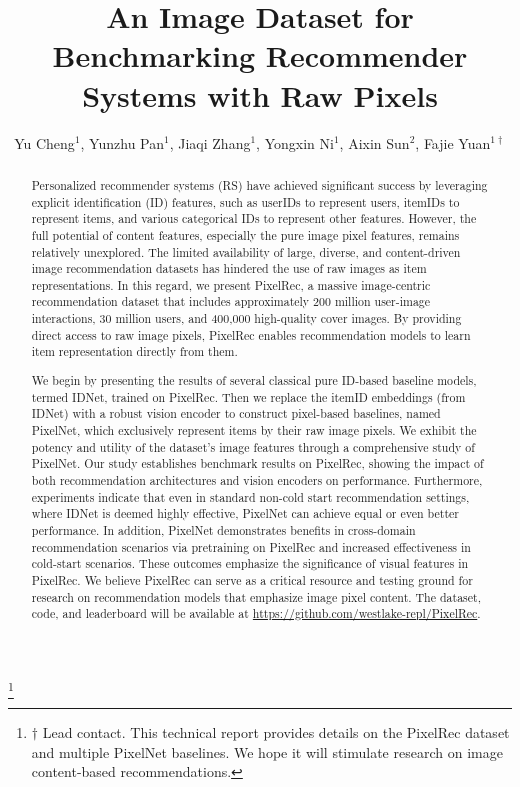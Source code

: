 \documentclass[sigconf]{acmart}
\begin{document}
\title{An Image Dataset for Benchmarking Recommender Systems with Raw Pixels}
\author{Yu Cheng$^{1}$, Yunzhu Pan$^{1}$, Jiaqi Zhang$^{1}$, Yongxin Ni$^{1}$, Aixin Sun$^{2}$, Fajie Yuan$^{1\dagger}$}


\thanks{$\dagger$ Lead contact. This technical report provides details on the PixelRec dataset and multiple PixelNet baselines. We hope it will stimulate research on image content-based recommendations.} 

 


\renewcommand{\shortauthors}{Cheng et al.}

\begin{abstract}
Personalized recommender systems (RS) have achieved significant success by leveraging explicit identification (ID) features, such as userIDs to represent users, itemIDs to represent items, and various categorical IDs to represent other features. However, the full potential of content features, especially the pure image pixel features, remains relatively unexplored. The limited availability of large, diverse, and content-driven image recommendation datasets has hindered the use of raw images as item representations. In this regard, we present PixelRec, a massive image-centric recommendation dataset that includes approximately 200 million user-image interactions, 30 million users, and 400,000 high-quality cover images. By providing direct access to raw image pixels, PixelRec enables recommendation models to learn item representation directly from them.

    We begin by presenting the results of several classical pure ID-based baseline models, termed IDNet, trained on PixelRec. Then we replace the itemID embeddings (from IDNet) with a robust vision encoder to construct pixel-based baselines, named PixelNet, which exclusively represent items by their raw image pixels. We exhibit the potency and utility of the dataset's image features through a comprehensive study of PixelNet. Our study  establishes benchmark results on  PixelRec, showing the impact of both   recommendation architectures and vision encoders on performance. Furthermore, experiments indicate that even in standard non-cold start recommendation settings, where IDNet is deemed highly effective, PixelNet can achieve equal or even better performance. In addition, PixelNet demonstrates benefits in cross-domain recommendation scenarios via pretraining on PixelRec and increased effectiveness in cold-start scenarios. These outcomes emphasize the significance of visual features in PixelRec. We believe PixelRec can serve as a critical resource and testing ground for research on recommendation models that emphasize image pixel content.
The dataset, code, and leaderboard will be available at \textcolor{blue}{\url{https://github.com/westlake-repl/PixelRec}}.
	\end{abstract}
 
\end{document}

